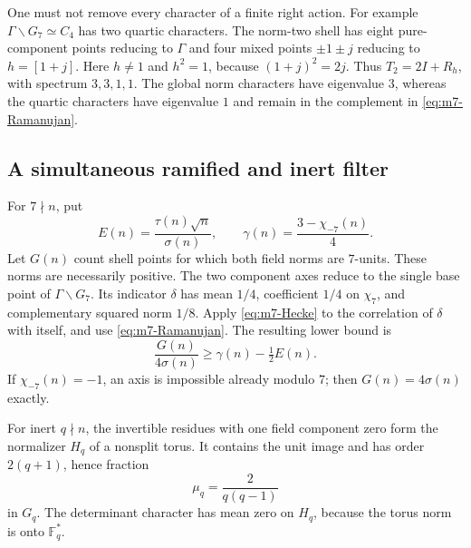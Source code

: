 One must not remove every character of a finite right action.
For example \(\Gamma\backslash G_7\simeq C_4\) has two quartic
characters. The norm-two shell has eight pure-component points
reducing to \(\Gamma\) and four mixed points \(\pm1\pm j\)
reducing to \(h=[1+j]\). Here \(h\ne1\) and \(h^2=1\), because
\((1+j)^2=2j\). Thus
\(T_2=2I+R_h\), with spectrum \(3,3,1,1\).
The global norm characters have eigenvalue \(3\), whereas the
quartic characters have eigenvalue \(1\) and remain in the
complement in \eqref{eq:m7-Ramanujan}.

\subsection{A simultaneous ramified and inert filter}

For \(7\nmid n\), put
\[
 E(n)=\frac{\tau(n)\sqrt n}{\sigma(n)},\qquad
                     \gamma(n)=\frac{3-\chi_{-7}(n)}4 .
\]
Let \(G(n)\) count shell points for which both field norms are
\(7\)-units. These norms are necessarily positive. The two
component axes reduce to the single base point of
\(\Gamma\backslash G_7\). Its indicator \(\delta\) has mean
\(1/4\), coefficient \(1/4\) on \(\chi_7\), and complementary
squared norm \(1/8\). Apply \eqref{eq:m7-Hecke} to the correlation
of \(\delta\) with itself, and use \eqref{eq:m7-Ramanujan}.
The resulting lower bound is
\begin{equation}
                 \frac{G(n)}{4\sigma(n)}
                       \ge\gamma(n)-\tfrac12 E(n).             \label{eq:m7-good7}
\end{equation}
If \(\chi_{-7}(n)=-1\), an axis is impossible already modulo \(7\);
then \(G(n)=4\sigma(n)\) exactly.

For inert \(q\nmid n\), the invertible residues with one field
component zero form the normalizer \(H_q\) of a nonsplit torus.
It contains the unit image and has order \(2(q+1)\), hence fraction
\[
                            \mu_q=\frac{2}{q(q-1)}
\]
in \(G_q\). The determinant character has mean zero on \(H_q\),
because the torus norm is onto \(\mathbb F_q^*\).

